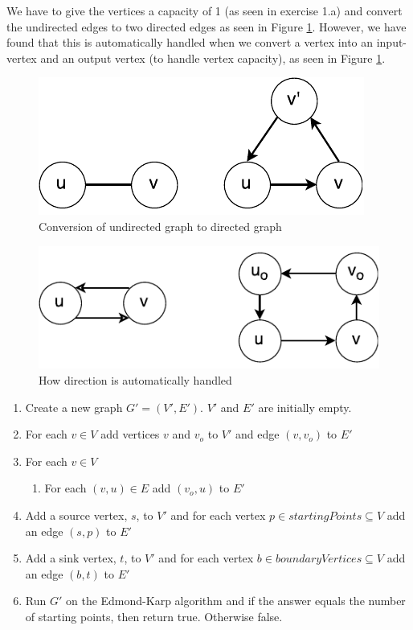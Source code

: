 \documentclass[koma,a4paper]{article}
\begin{document}
We have to give the vertices a capacity of 1 (as seen in exercise 1.a) and convert the undirected edges to two directed edges as seen in Figure \ref{fig:two_way1}. However, we have found that this is automatically handled when we convert a vertex into an input-vertex and an output vertex (to handle vertex capacity), as seen in Figure \ref{fig:two_way1}.
\begin{figure}
  \includegraphics{two_way_path}
  \caption{Conversion of undirected graph to directed graph}
  \label{fig:two_way1}
\end{figure}
\begin{figure}
  \includegraphics{two_way_path2}
  \caption{How direction is automatically handled}
  \label{fig:two_way2}
\end{figure}

\begin{enumerate}
  \item Create a new graph $G' = (V', E')$. $V'$ and $E'$ are initially empty.
  \item For each $v \in V$ add vertices $v$ and $v_o$ to $V'$ and edge $(v, v_o)$ to $E'$
  \item For each $v \in V$
  \begin{enumerate}
    \item For each $(v, u) \in E$ add $(v_o, u)$ to $E'$
  \end{enumerate}
  \item Add a source vertex, $s$, to $V'$ and for each vertex $p \in \mathit{startingPoints} \subseteq V$ add an edge $(s, p)$ to $E'$
  \item Add a sink vertex, $t$, to $V'$ and for each vertex $b \in \mathit{boundaryVertices} \subseteq V$ add an edge $(b, t)$ to $E'$
  \item Run $G'$ on the Edmond-Karp algorithm and if the answer equals the number of starting points, then return true. Otherwise false.
\end{enumerate}
\end{document}
